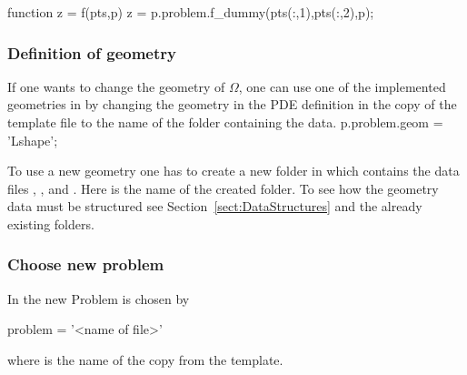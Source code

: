 \bigskip

\begin{pcode}
function z = f(pts,p)
z = p.problem.f_dummy(pts(:,1),pts(:,2),p);
\end{pcode}

\subsubsection{Definition of geometry}
\label{sect:QuickStart:ProblemDefinition:Geometry}

\noindent If one wants to change the geometry of $\Omega$, one can use one of the implemented geometries in  by changing the geometry in the PDE definition in the copy of the template file to the name of the folder containing the data.
p.problem.geom = 'Lshape';\bigskip

\noindent To use a new geometry one has to create a new folder in  which contains the data files , ,  and . Here  is the name of the created folder. To see how the geometry data must be structured see Section~\ref{sect:DataStructures} and the already existing folders.

\subsubsection{Choose new problem}

\noindent In  the new Problem is chosen by
\begin{pcode}
problem = '<name of file>'
\end{pcode}
where  is the name of the copy from the template.

\clearpage
